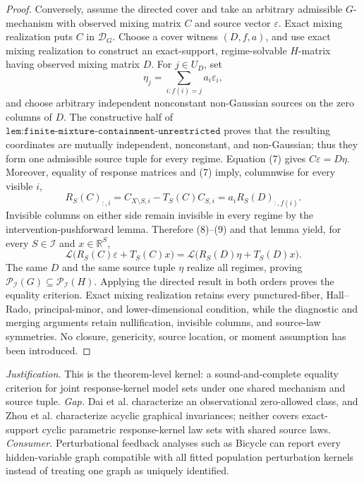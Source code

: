 \documentclass{article}
\begin{document}
\begin{proof}
Conversely, assume the directed cover and take an arbitrary admissible \(G\)-mechanism with observed mixing matrix \(C\) and source vector \(\varepsilon\). Exact mixing realization puts \(C\) in \(\mathcal D_G\). Choose a cover witness \((D,f,a)\), and use exact mixing realization to construct an exact-support, regime-solvable \(H\)-matrix having observed mixing matrix \(D\). For \(j\in U_D\), set
\[
\eta_j=\sum_{i:f(i)=j}a_i\varepsilon_i, \tag{8}
\]
and choose arbitrary independent nonconstant non-Gaussian sources on the zero columns of \(D\). The constructive half of \(\texttt{lem:finite-mixture-containment-unrestricted}\) proves that the resulting coordinates are mutually independent, nonconstant, and non-Gaussian; thus they form one admissible source tuple for every regime. Equation (7) gives \(C\varepsilon=D\eta\). Moreover, equality of response matrices and (7) imply, columnwise for every visible \(i\),
\[
R_S(C)_{:,i}
=C_{X\setminus S,i}-T_S(C)C_{S,i}
=a_iR_S(D)_{:,f(i)}. \tag{9}
\]
Invisible columns on either side remain invisible in every regime by the intervention-pushforward lemma. Therefore (8)--(9) and that lemma yield, for every \(S\in\mathcal I\) and \(x\in\mathbb R^S\),
\[
\mathcal L\bigl(R_S(C)\varepsilon+T_S(C)x\bigr)
=\mathcal L\bigl(R_S(D)\eta+T_S(D)x\bigr).
\]
The same \(D\) and the same source tuple \(\eta\) realize all regimes, proving \(\mathcal P_{\mathcal I}(G)\subseteq\mathcal P_{\mathcal I}(H)\). Applying the directed result in both orders proves the equality criterion. Exact mixing realization retains every punctured-fiber, Hall--Rado, principal-minor, and lower-dimensional condition, while the diagnostic and merging arguments retain nullification, invisible columns, and source-law symmetries. No closure, genericity, source location, or moment assumption has been introduced.
\end{proof}
\par\smallskip\noindent \textit{Justification.} This is the theorem-level kernel: a sound-and-complete equality criterion for joint response-kernel model sets under one shared mechanism and source tuple. \textit{Gap.} Dai et al. characterize an observational zero-allowed class, and Zhou et al. characterize acyclic graphical invariances; neither covers exact-support cyclic parametric response-kernel law sets with shared source laws. \textit{Consumer.} Perturbational feedback analyses such as Bicycle can report every hidden-variable graph compatible with all fitted population perturbation kernels instead of treating one graph as uniquely identified.
\end{document}
